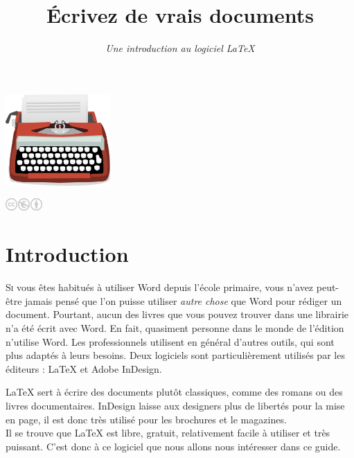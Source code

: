 \documentclass[10pt]{article}
\title{\huge{Écrivez de vrais documents}}
\author{\emph{Une introduction au logiciel LaTeX}}
\begin{document}
\maketitle
\vspace{30mm}
\begin{center}
\includegraphics[width=40mm]{figures/remington.pdf}
\vspace{10mm}

\includegraphics[width=14mm]{figures/cc}
\end{center}
\thispagestyle{empty}
\clearpage


\section*{Introduction}

\lettrine[lines=3]{S}{i} vous êtes habitués à utiliser Word depuis l'école primaire, vous n'avez peut-être jamais pensé que l'on puisse utiliser \emph{autre chose} que Word pour rédiger un document.
Pourtant, aucun des livres que vous pouvez trouver dans une librairie n'a été écrit avec Word.
En fait, quasiment personne dans le monde de l'édition n'utilise Word.
Les professionnels utilisent en général d'autres outils, qui sont plus adaptés à leurs besoins.
Deux logiciels sont particulièrement utilisés par les éditeurs : LaTeX et Adobe InDesign.

LaTeX sert à écrire des documents plutôt classiques, comme des romans ou des livres documentaires. InDesign laisse aux designers plus de libertés pour la mise en page, il est donc très utilisé pour les brochures et le magazines.\\

Il se trouve que LaTeX est libre, gratuit, relativement facile à utiliser et très puissant.
C'est donc à ce logiciel que nous allons nous intéresser dans ce guide.

\end{document}
